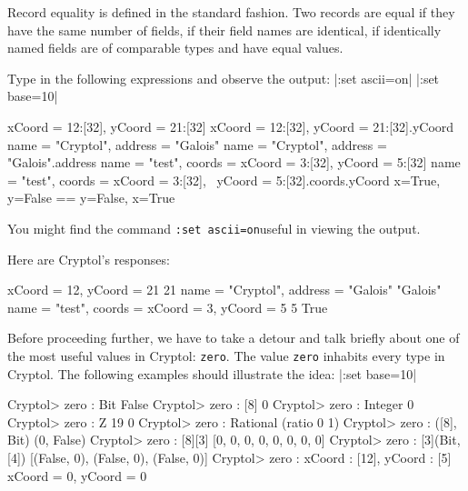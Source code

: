 Record equality is defined in the standard fashion.  Two records are
equal if they have the same number of fields, if their field names are
identical, if identically named fields are of comparable types and
have equal values.

\restartrepl
\begin{Exercise}\label{ex:record:1}
Type in the following expressions and observe the output:
\hidereplin|:set ascii=on|
\hidereplin|:set base=10|
\begin{replinVerb}
  {xCoord = 12:[32], yCoord = 21:[32]}
  {xCoord = 12:[32], yCoord = 21:[32]}.yCoord
  {name = "Cryptol", address = "Galois"}
  {name = "Cryptol", address = "Galois"}.address
  {name = "test", coords = {xCoord = 3:[32], yCoord = 5:[32]}}
  {name = "test", coords = {xCoord = 3:[32], \
                            yCoord = 5:[32]}}.coords.yCoord
  {x=True, y=False} == {y=False, x=True}
\end{replinVerb}
\noindent You might find the command {\tt :set
  ascii=on}\indSettingASCII useful in viewing the output.
\end{Exercise}
\begin{Answer}
Here are Cryptol's responses:
\begin{small}
\begin{reploutVerb}
  {xCoord = 12, yCoord = 21}
  21
  {name = "Cryptol", address = "Galois"}
  "Galois"
  {name = "test", coords = {xCoord = 3, yCoord = 5}}
  5
  True
\end{reploutVerb}
\end{small}
\end{Answer}


Before proceeding further, we have to take a detour and talk briefly
about one of the most useful values in Cryptol: {\tt zero}.\indZero
The value {\tt zero} inhabits every type in Cryptol.
The following examples should illustrate the idea:
\restartrepl
\hidereplin|:set base=10|
\begin{replPrompt}
  Cryptol> zero : Bit
  False
  Cryptol> zero : [8]
  0
  Cryptol> zero : Integer
  0
  Cryptol> zero : Z 19
  0
  Cryptol> zero : Rational
  (ratio 0 1)
  Cryptol> zero : ([8], Bit)
  (0, False)
  Cryptol> zero : [8][3]
  [0, 0, 0, 0, 0, 0, 0, 0]
  Cryptol> zero : [3](Bit, [4])
  [(False, 0), (False, 0), (False, 0)]
  Cryptol> zero : {xCoord : [12], yCoord : [5]}
  {xCoord = 0, yCoord = 0}
\end{replPrompt}

